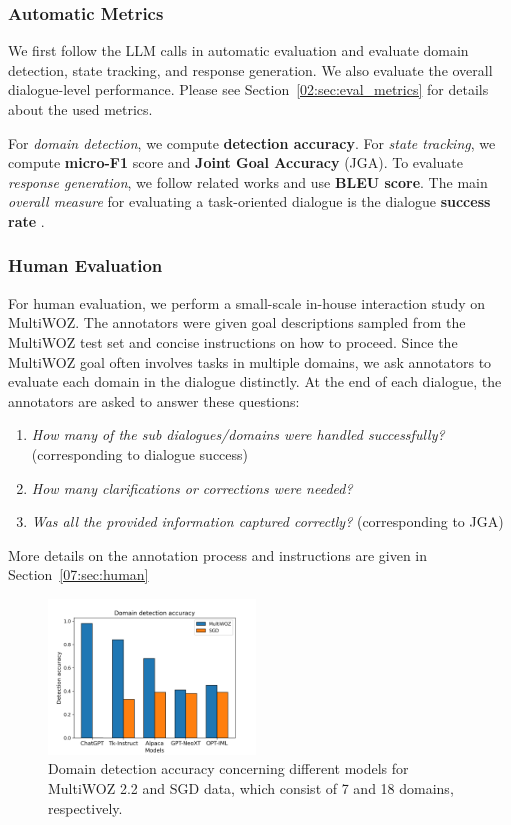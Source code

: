 \subsubsection*{Automatic Metrics}
We first follow the LLM calls in automatic evaluation and evaluate domain detection, state tracking, and response generation.
We also evaluate the overall dialogue-level performance.
Please see Section~\ref{02:sec:eval_metrics} for details about the used metrics.

For \emph{domain detection}, we compute \textbf{detection accuracy}.
For \emph{state tracking}, we compute \textbf{micro-F1} score and \textbf{Joint Goal Accuracy} (JGA).
To evaluate \emph{response generation}, we follow related works and use \textbf{BLEU score}.
The main \emph{overall measure} for evaluating a task-oriented dialogue is the dialogue \textbf{success rate} \cite{deriu_survey_2021}.

\subsubsection*{Human Evaluation}
For human evaluation, we perform a small-scale in-house interaction study on MultiWOZ.
The annotators were given goal descriptions sampled from the MultiWOZ test set and concise instructions on how to proceed.
Since the MultiWOZ goal often involves tasks in multiple domains, we ask annotators to evaluate each domain in the dialogue distinctly.
At the end of each dialogue, the annotators are asked to answer these questions:
\begin{enumerate}
    \item \emph{How many of the sub dialogues/domains were handled successfully?} (corresponding to dialogue success)
    \item \emph{How many clarifications or corrections were needed?}
    \item \emph{Was all the provided information captured correctly?} (corresponding to JGA)
\end{enumerate}
More details on the annotation process and instructions are given in Section~\ref{07:sec:human}

\begin{figure}[h]
    \centering
    \includegraphics[width=0.49\textwidth]{images/domain-detections.png}
    \caption{Domain detection accuracy concerning different models for MultiWOZ 2.2 and SGD data, which consist of 7 and 18 domains, respectively.}
    \label{07:fig:domains}
\end{figure}


